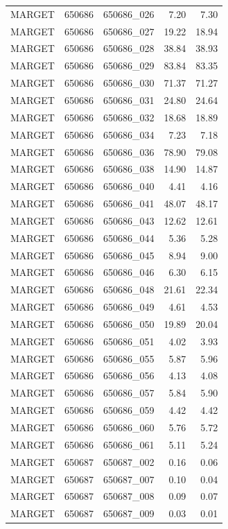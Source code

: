 \begin{tabular}{lllrr}
MARGET & 650686 & 650686_026 & 7.20 & 7.30 \\
MARGET & 650686 & 650686_027 & 19.22 & 18.94 \\
MARGET & 650686 & 650686_028 & 38.84 & 38.93 \\
MARGET & 650686 & 650686_029 & 83.84 & 83.35 \\
MARGET & 650686 & 650686_030 & 71.37 & 71.27 \\
MARGET & 650686 & 650686_031 & 24.80 & 24.64 \\
MARGET & 650686 & 650686_032 & 18.68 & 18.89 \\
MARGET & 650686 & 650686_034 & 7.23 & 7.18 \\
MARGET & 650686 & 650686_036 & 78.90 & 79.08 \\
MARGET & 650686 & 650686_038 & 14.90 & 14.87 \\
MARGET & 650686 & 650686_040 & 4.41 & 4.16 \\
MARGET & 650686 & 650686_041 & 48.07 & 48.17 \\
MARGET & 650686 & 650686_043 & 12.62 & 12.61 \\
MARGET & 650686 & 650686_044 & 5.36 & 5.28 \\
MARGET & 650686 & 650686_045 & 8.94 & 9.00 \\
MARGET & 650686 & 650686_046 & 6.30 & 6.15 \\
MARGET & 650686 & 650686_048 & 21.61 & 22.34 \\
MARGET & 650686 & 650686_049 & 4.61 & 4.53 \\
MARGET & 650686 & 650686_050 & 19.89 & 20.04 \\
MARGET & 650686 & 650686_051 & 4.02 & 3.93 \\
MARGET & 650686 & 650686_055 & 5.87 & 5.96 \\
MARGET & 650686 & 650686_056 & 4.13 & 4.08 \\
MARGET & 650686 & 650686_057 & 5.84 & 5.90 \\
MARGET & 650686 & 650686_059 & 4.42 & 4.42 \\
MARGET & 650686 & 650686_060 & 5.76 & 5.72 \\
MARGET & 650686 & 650686_061 & 5.11 & 5.24 \\
MARGET & 650687 & 650687_002 & 0.16 & 0.06 \\
MARGET & 650687 & 650687_007 & 0.10 & 0.04 \\
MARGET & 650687 & 650687_008 & 0.09 & 0.07 \\
MARGET & 650687 & 650687_009 & 0.03 & 0.01 \\

\end{tabular}
